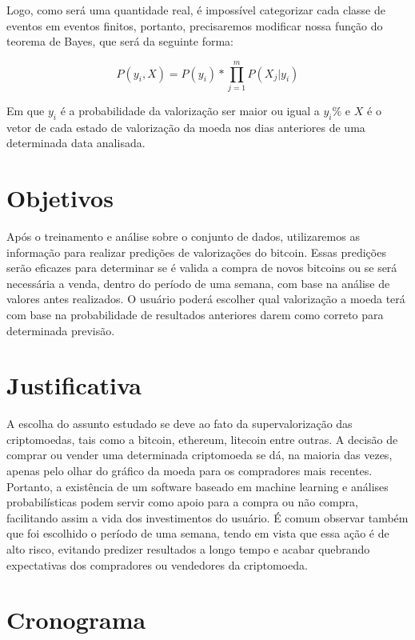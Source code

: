 \documentclass[conference]{IEEEtran}
\begin{document}
Logo, como será uma quantidade real, é impossível categorizar cada classe de eventos em eventos finitos, portanto, precisaremos modificar nossa função do teorema de Bayes, que será da seguinte forma:

\begin{equation}
    P(y_i, X) = P(y_i) * \prod_{j=1}^{m} P(X_j|y_i)
\end{equation}

Em que \(y_i\) é a probabilidade da valorização ser maior ou igual a \(y_i\%\) e \(X\) é o vetor de cada estado de valorização da moeda nos dias anteriores de uma determinada data analisada.

\section{Objetivos}

Após o treinamento e análise sobre o conjunto de dados, utilizaremos as informação para realizar predições de valorizações do bitcoin. Essas predições serão eficazes para determinar se é valida a compra de novos bitcoins ou se será necessária a venda, dentro do período de uma semana, com base na análise de valores antes realizados. O usuário poderá escolher qual valorização a moeda terá com base na probabilidade de resultados anteriores darem como correto para determinada previsão.

\section{Justificativa}

A escolha do assunto estudado se deve ao fato da supervalorização das criptomoedas, tais como a bitcoin, ethereum, litecoin entre outras. A decisão de comprar ou vender uma determinada criptomoeda se dá, na maioria das vezes, apenas pelo olhar do gráfico da moeda para os compradores mais recentes. Portanto, a existência de um software baseado em machine learning e análises probabilísticas podem servir como apoio para a compra ou não compra, facilitando assim a vida dos investimentos do usuário. É comum observar também que foi escolhido o período de uma semana, tendo em vista que essa ação é de alto risco, evitando predizer resultados a longo tempo e acabar quebrando expectativas dos compradores ou vendedores da criptomoeda.

\section{Cronograma}
\end{document}
